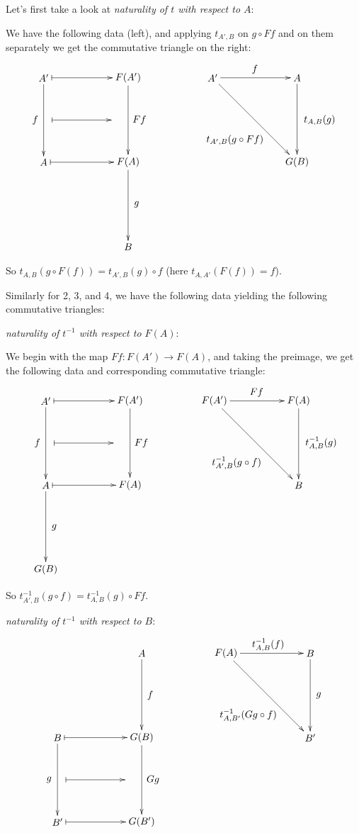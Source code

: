 \documentclass[11pt]{article}
\theoremstyle{definition}
\theoremstyle{definition}
\theoremstyle{plain}
\theoremstyle{plain}
\theoremstyle{plain}
\begin{document}
Let's first take a look at \emph{naturality of $t$ with respect to $A$}:

We have the following data (left), and applying $t_{A',B}$ on $g \circ Ff$ and on them separately we get the commutative triangle on the right:

\begin{equation*}
\begin{xy}
(0,0)*+{A'}="ap"; (30, 0)*+{F(A')}="fap"; (0, -30)*+{A}="a"; (30, -30)*+{F(A)}="fa"; (30, -60)*+{B}="b";
(60,0)*+{A'}="apt"; (90, 0)*+{A}="at"; (90, -30)*+{G(B)}="gb";
{\ar "ap";"a"}?*!/^3mm/{f}; {\ar "fap";"fa"}?*!/_4mm/{Ff}; {\ar "fa";"b"}?*!/_3mm/{g};
{\ar@{|->} "ap";"fap"}; {\ar@{|->} (3,-15);(24, -15)}; {\ar@{|->} "a";"fa"};
{\ar "apt";"at"}?*!/_3mm/{f};
{\ar "at";"gb"}?*!/_8mm/{t_{A,B}(g)};
{\ar "apt";"gb"}?*!/^10mm/{t_{A',B}(g \circ Ff)}
\end{xy}
\end{equation*}

So $t_{A,B}(g \circ F(f)) = t_{A',B}(g) \circ f$ (here $t_{A,A'}(F(f)) = f$).

Similarly for 2, 3, and 4, we have the following data yielding the following commutative triangles:

\emph{naturality of $t^{-1}$ with respect to $F(A)$}:

We begin with the map $Ff : F(A') \to F(A)$, and taking the preimage, we get the following data and corresponding commutative triangle:

\begin{equation*}
\begin{xy}
(0,0)*+{A'}="ap"; (30, 0)*+{F(A')}="fap"; (0, -30)*+{A}="a"; (30, -30)*+{F(A)}="fa"; (00, -60)*+{G(B)}="gb";
(60,0)*+{F(A')}="fapt"; (90, 0)*+{F(A)}="fat"; (90, -30)*+{B}="b";
{\ar "ap";"a"}?*!/^3mm/{f}; {\ar "fap";"fa"}?*!/_4mm/{Ff}; {\ar "a";"gb"}?*!/_3mm/{g};
{\ar@{|->} "ap";"fap"}; {\ar@{|->} (3,-15);(24, -15)}; {\ar@{|->} "a";"fa"};
{\ar "fapt";"fat"}?*!/_3mm/{Ff};
{\ar "fat";"b"}?*!/_8mm/{t^{-1}_{A,B}(g)};
{\ar "fapt";"b"}?*!/^10mm/{t^{-1}_{A',B}(g \circ f)}
\end{xy}
\end{equation*}

So $t^{-1}_{A',B}(g \circ f) = t^{-1}_{A,B}(g) \circ Ff$.

\emph{naturality of $t^{-1}$ with respect to $B$}:

\begin{equation*}
\begin{xy}
(30, 0)*+{A}="a"; (0, -30)*+{B}="b"; (30, -30)*+{G(B)}="gb"; (0, -60)*+{B'}="bp"; (30, -60)*+{G(B')}="gbp";
(60, 0)*+{F(A)}="fat"; (90, 0)*+{B}="bt"; (90, -30)*+{B'}="bpt";
{\ar "a";"gb"}?*!/_3mm/{f}; {\ar "gb";"gbp"}?*!/_4mm/{Gg}; {\ar "b";"bp"}?*!/^3mm/{g};
{\ar@{|->} "b";"gb"}; {\ar@{|->} "bp";"gbp"}; {\ar@{|->} (3, -45);(24, -45)};
{\ar "fat";"bt"}?*!/_3mm/{t^{-1}_{A,B}(f)};
{\ar "bt";"bpt"}?*!/_3mm/{g};
{\ar "fat";"bpt"}?*!/^10mm/{t^{-1}_{A,B'}(Gg \circ f)};
\end{xy}
\end{equation*}
\end{document}
